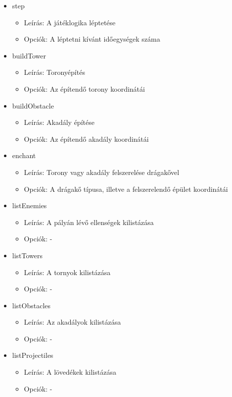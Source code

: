 \begin{itemize}
\item step
	\begin{itemize}
	\item Leírás: A játéklogika léptetése
	\item Opciók: A léptetni kívánt időegységek száma
	\end{itemize}

\item buildTower
	\begin{itemize}
	\item Leírás: Toronyépítés
	\item Opciók: Az építendő torony koordinátái
	\end{itemize}

\item buildObstacle
	\begin{itemize}
	\item Leírás: Akadály építése
	\item Opciók: Az építendő akadály koordinátái
	\end{itemize}

\item enchant
	\begin{itemize}
	\item Leírás: Torony vagy akadály felszerelése drágakővel
	\item Opciók: A drágakő típusa, illetve a felszerelendő épület koordinátái
	\end{itemize}

\item listEnemies
	\begin{itemize}
	\item Leírás: A pályán lévő ellenségek kilistázása
	\item Opciók: -
	\end{itemize}

\item listTowers
	\begin{itemize}
	\item Leírás: A tornyok kilistázása
	\item Opciók: -
	\end{itemize}

\item listObstacles
	\begin{itemize}
	\item Leírás: Az akadályok kilistázása
	\item Opciók: -
	\end{itemize}

\item listProjectiles
	\begin{itemize}
	\item Leírás: A lövedékek kilistázása
	\item Opciók: -
	\end{itemize}


\end{itemize}

